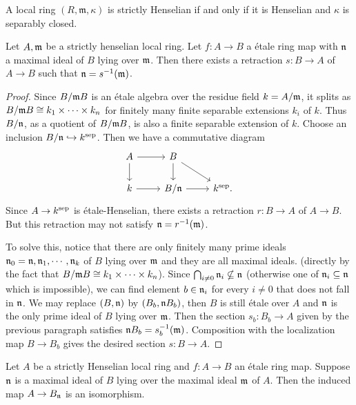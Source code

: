 \begin{example}
    A local ring $(R, \mathfrak{m}, \kappa)$ is strictly Henselian if and only if it is Henselian and $\kappa$ is separably closed.
\end{example}

\begin{proposition}
    \label{thm:strictly-henselian-good-retraction}
    Let \(A, {\mathfrak{m}}\) be a strictly henselian local ring. Let \(f : A \to B\) a \'etale ring map with \({\mathfrak{n}}\) a maximal ideal of \(B\) lying over \({\mathfrak{m}}\). Then there exists a retraction \(s : B \to A\) of \(A \to B\) such that \({\mathfrak{n}} = s^{-1}({\mathfrak{m}})\).
\end{proposition}

\begin{proof}
  Since \(B/{\mathfrak{m}} B\) is an étale algebra over the residue field \(k = A/{\mathfrak{m}}\), it splits as \(B/{\mathfrak{m}} B \cong k_1 \times \cdots \times k_n\) for finitely many finite separable extensions \(k_i\) of \(k\). Thus \(B/{\mathfrak{n}}\), as a quotient of \(B/{\mathfrak{m}} B\), is also a finite separable extension of \(k\). Choose an inclusion \(B/{\mathfrak{n}} \hookrightarrow k^{\textnormal{sep}}\). Then we have a commutative diagram
  \[
  \begin{tikzcd}
    A \arrow{r} \arrow{d} & B \arrow{d}\arrow{rd} & \\
    k \arrow{r} & B/\n \arrow{r} & k^{\sep}.
  \end{tikzcd}
  \]
  Since \(A \to k^{\textnormal{sep}}\) is étale-Henselian, there exists a retraction \(r : B \to A\) of \(A \to B\). But this retraction may not satisfy \({\mathfrak{n}} = r^{-1}({\mathfrak{m}})\). 
  
  To solve this, notice that there are only finitely many prime ideals \({\mathfrak{n}}_0 = {\mathfrak{n}}, {\mathfrak{n}}_1, \cdots, {\mathfrak{n}}_k\) of \(B\) lying over \({\mathfrak{m}}\) and they are all maximal ideals. (directly by the fact that \(B/{\mathfrak{m}} B \cong k_1 \times \cdots \times k_n\)). Since \(\bigcap_{i \ne 0} {\mathfrak{n}}_i \nsubseteq {\mathfrak{n}}\) (otherwise one of \({\mathfrak{n}}_i \subseteq {\mathfrak{n}}\) which is impossible), we can find element \(b \in {\mathfrak{n}}_i\) for every \(i \ne 0\) that does not fall in ${\mathfrak{n}}$. We may replace \((B, {\mathfrak{n}})\) by \((B_b, {\mathfrak{n}} B_b)\), then \(B\) is still étale over \(A\) and \({\mathfrak{n}}\) is the only prime ideal of \(B\) lying over \({\mathfrak{m}}\). Then the section \(s_b : B_b \to A\) given by the previous paragraph satisfies \({\mathfrak{n}} B_b = s_b^{-1}({\mathfrak{m}})\). Composition with the localization map \(B \to B_b\) gives the desired section \(s : B \to A\).
\end{proof}

\begin{proposition}
    \label{thm:etale-over-strictly-henselian-localization-isom}
    Let \(A\) be a strictly Henselian local ring and \(f : A \to B\) an étale ring map. Suppose \({\mathfrak{n}}\) is a maximal ideal of \(B\) lying over the maximal ideal \({\mathfrak{m}}\) of \(A\). Then the induced map \(A \to B_{\mathfrak{n}}\) is an isomorphism.
\end{proposition}

